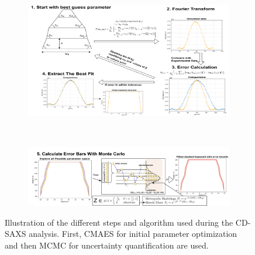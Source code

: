 \begin{figure}[h]
    \centering
    \begin{subfigure}[b]{1\textwidth}
        \centering
        \includegraphics[width=\textwidth]{images/cmaes_overall.png}
    \end{subfigure}
    \\
    \begin{subfigure}[b]{1\textwidth}
        \centering
        \includegraphics[width=\textwidth]{images/mcmc_overall.png}
    \end{subfigure}
    \caption{Illustration of the different steps and algorithm used during the CD-SAXS analysis. First, CMAES for initial parameter optimization and then MCMC for uncertainty quantification are used.}
    \label{fig:cd_saxs_algo}
\end{figure}

\FloatBarrier


